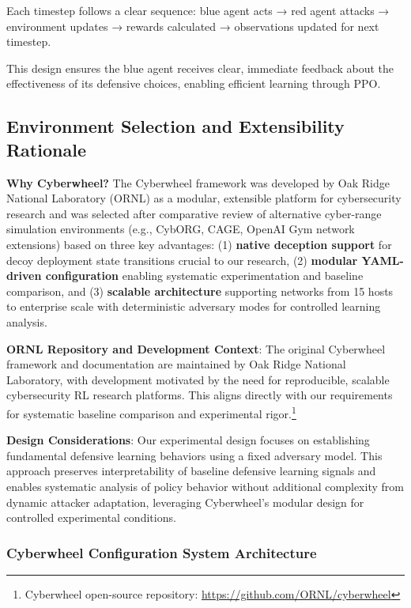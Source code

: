 \documentclass[12pt,oneside]{article}
\begin{document}
Each timestep follows a clear sequence: blue agent acts → red agent attacks → environment updates → rewards calculated → observations updated for next timestep.

This design ensures the blue agent receives clear, immediate feedback about the effectiveness of its defensive choices, enabling efficient learning through PPO.


\subsection{Environment Selection and Extensibility Rationale}

\textbf{Why Cyberwheel?} The Cyberwheel framework was developed by Oak Ridge National Laboratory (ORNL) as a modular, extensible platform for cybersecurity research and was selected after comparative review of alternative cyber-range simulation environments (e.g., CybORG, CAGE, OpenAI Gym network extensions) based on three key advantages: (1) \textbf{native deception support} for decoy deployment state transitions crucial to our research, (2) \textbf{modular YAML-driven configuration} enabling systematic experimentation and baseline comparison, and (3) \textbf{scalable architecture} supporting networks from 15 hosts to enterprise scale with deterministic adversary modes for controlled learning analysis.

\textbf{ORNL Repository and Development Context}: The original Cyberwheel framework and documentation are maintained by Oak Ridge National Laboratory, with development motivated by the need for reproducible, scalable cybersecurity RL research platforms. This aligns directly with our requirements for systematic baseline comparison and experimental rigor.\footnote{Cyberwheel open-source repository: \url{https://github.com/ORNL/cyberwheel}}

\textbf{Design Considerations}: Our experimental design focuses on establishing fundamental defensive learning behaviors using a fixed adversary model. This approach preserves interpretability of baseline defensive learning signals and enables systematic analysis of policy behavior without additional complexity from dynamic attacker adaptation, leveraging Cyberwheel's modular design for controlled experimental conditions.

\subsubsection{Cyberwheel Configuration System Architecture}
\end{document}
